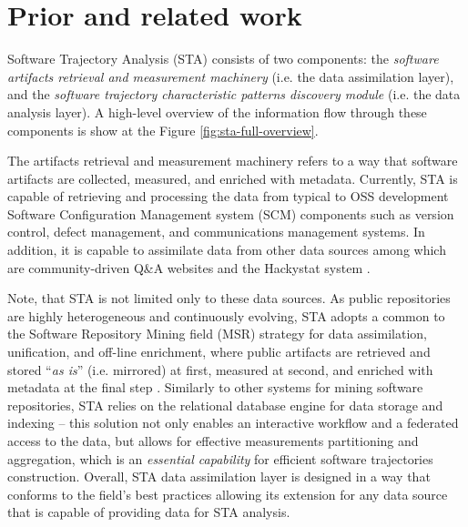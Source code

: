 \chapter{Prior and related work}\label{chapter_background_work}
Software Trajectory Analysis (STA) consists of two components: 
the \textit{software artifacts retrieval and measurement machinery} (i.e. the data assimilation layer), 
and the \textit{software trajectory characteristic patterns discovery module} (i.e. the data analysis layer). 
A high-level overview of the information flow through these components is show at the Figure \ref{fig:sta-full-overview}.

The artifacts retrieval and measurement machinery refers to a way that software artifacts are collected, 
measured, and enriched with metadata. 
Currently, STA is capable of retrieving and processing the data from typical to OSS development Software 
Configuration Management system (SCM) components such as version control, 
defect management, and communications management systems. 
In addition, it is capable to assimilate data from other data sources among which are community-driven 
Q\&A websites and the Hackystat system \cite{csdl2-10-09}.

Note, that STA is not limited only to these data sources.
As public repositories are highly heterogeneous and continuously evolving, STA adopts a common to the 
Software Repository Mining field (MSR) strategy for data assimilation, unification, and off-line enrichment,
where public artifacts are retrieved and stored ``\textit{as is}'' (i.e. mirrored) at first, 
measured at second, and enriched with metadata at the final step 
\cite{citeulike:12550438} \cite{german04_softchange} \cite{cvsanaly}.
Similarly to other systems for mining software repositories, STA relies on the relational database engine 
for data storage and indexing -- this solution not only enables an interactive workflow and a federated 
access to the data, but allows for effective measurements partitioning and aggregation, which is 
an \textit{essential capability} for efficient software trajectories construction.
Overall, STA data assimilation layer is designed in a way that conforms to the field's best practices
allowing its extension for any data source that is capable of providing data for STA analysis.

